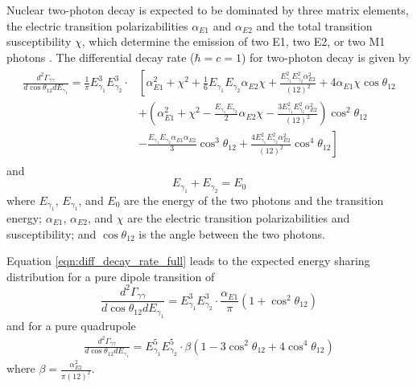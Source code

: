 \documentclass[cnatzke_thesis_proposal.tex]{subfiles}
\begin{document}
Nuclear two-photon decay is expected to be dominated by three matrix elements, the electric transition polarizabilities $\alpha_{E1}$ and $\alpha_{E2}$ and the total transition susceptibility $\chi$, which determine the emission of two E1, two E2, or two M1 photons \cite{kramp_nuclear_1987}.
The differential decay rate ($\hbar = c = 1$) for two-photon decay is given by 
\begin{align} \label{eqn:diff_decay_rate_full}
    \begin{split}
    \frac{d^2\Gamma_{\gamma\gamma}}{d \cos\theta_{12} dE_{\gamma_1}} = \frac{1}{\pi} E_{\gamma_1}^3 E_{\gamma_2}^3 \cdot & \left[ \alpha^2_{E1} + \chi^2 + \frac{1}{6} E_{\gamma_1} E_{\gamma_2} \alpha_{E2} \chi + \frac{E_{\gamma_1}^2 E_{\gamma_2}^2 \alpha_{E2}^2}{(12)^2} + 4 \alpha_{E1} \chi \cos\theta_{12} \right. \\ 
    &\left. + \left(\alpha_{E1}^2 + \chi^2 - \frac{E_{\gamma_1} E_{\gamma_2}}{2} \alpha_{E2} \chi - \frac{3 E_{\gamma_1}^2 E_{\gamma_2}^2 \alpha_{E2}^2}{(12)^2}\right) \cos^2\theta_{12} \right. \\
    &\left. - \frac{E_{\gamma_1} E_{\gamma_2} \alpha_{E1} \alpha_{E2}}{3} \cos^3\theta_{12} + \frac{4 E_{\gamma_1}^2 E_{\gamma_2}^2 \alpha_{E2}^2}{(12)^2} \cos^4\theta_{12} \right]
    \end{split}
\end{align}
and     
\begin{equation} \label{eqn:two_photon_energy_sum}
    E_{\gamma_1} + E_{\gamma_2} = E_0
\end{equation}
where $E_{\gamma_1}$, $E_{\gamma_1}$, and $E_{0}$ are the energy of the two photons and the transition energy; $\alpha_{E1}$, $\alpha_{E2}$, and $\chi$ are the electric transition polarizabilities and susceptibility; and $\cos\theta_{12}$ is the angle between the two photons. 

Equation \ref{eqn:diff_decay_rate_full} leads to the expected energy sharing distribution for a pure dipole transition of 
\begin{equation}
    \frac{d^2\Gamma_{\gamma\gamma}}{d \cos\theta_{12} dE_{\gamma_1}} =  E_{\gamma_1}^3 E_{\gamma_2}^3 \cdot \frac{\alpha_{E1}}{\pi} \left( 1 + \cos^2\theta_{12} \right)
\end{equation}
and for a pure quadrupole
\begin{align}
    \frac{d^2\Gamma_{\gamma\gamma}}{d \cos\theta_{12} dE_{\gamma_1}} = E_{\gamma_1}^5 E_{\gamma_2}^5 \cdot \beta \left( 1 - 3 \cos^2\theta_{12} + 4 \cos^4 \theta_{12} \right) 
\end{align}
where $\beta = \frac{\alpha_{E2}^2}{\pi (12)^2}$.
\end{document}
